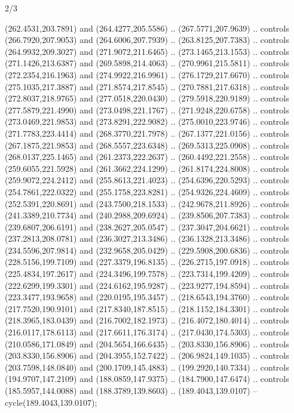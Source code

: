 \begin{flagdescription}{2/3}
\begin{scope}[xshift=0.5\flaglength,yshift=0.5\flagwidth,scale=\flagwidth/240]
\begin{scope}[y=0.8pt, x=0.8pt, yscale=-1,shift={(-225.0,-150)}]
  (262.4531,203.7891) and (264.4277,205.5586) .. (267.5771,207.9639) .. controls
  (266.7920,207.9053) and (264.6006,207.7939) .. (263.8125,207.7383) .. controls
  (264.9932,209.3027) and (271.9072,211.6465) .. (273.1465,213.1553) .. controls
  (271.1426,213.6387) and (269.5898,214.4063) .. (270.9961,215.5811) .. controls
  (272.2354,216.1963) and (274.9922,216.9961) .. (276.1729,217.6670) .. controls
  (275.1035,217.3887) and (271.8574,217.8545) .. (270.7881,217.6318) .. controls
  (272.8037,218.9765) and (277.0518,220.0430) .. (279.5918,220.9189) .. controls
  (277.5879,221.4990) and (273.0498,221.1767) .. (271.9248,220.6758) .. controls
  (273.0469,221.9853) and (273.8291,222.9082) .. (275.0010,223.9746) .. controls
  (271.7783,223.4414) and (268.3770,221.7978) .. (267.1377,221.0156) .. controls
  (267.1875,221.9853) and (268.5557,223.6348) .. (269.5313,225.0908) .. controls
  (268.0137,225.1465) and (261.2373,222.2637) .. (260.4492,221.2558) .. controls
  (259.6055,221.5928) and (261.3662,224.1299) .. (261.8174,224.8008) .. controls
  (259.9072,224.2412) and (255.8613,221.4023) .. (254.6396,220.5293) .. controls
  (254.7861,222.0322) and (255.1758,223.8281) .. (254.9326,224.4609) .. controls
  (252.5391,220.8691) and (243.7500,218.1533) .. (242.9678,211.8926) .. controls
  (241.3389,210.7734) and (240.2988,209.6924) .. (239.8506,207.7383) .. controls
  (239.6807,206.6191) and (238.2627,205.0547) .. (237.3047,204.6621) .. controls
  (237.2813,208.0781) and (236.3027,213.3486) .. (236.1328,213.3486) .. controls
  (234.5596,207.9814) and (232.9658,205.0429) .. (229.5908,200.6836) .. controls
  (228.5156,199.7109) and (227.3379,196.8135) .. (226.2715,197.0918) .. controls
  (225.4834,197.2617) and (224.3496,199.7578) .. (223.7314,199.4209) .. controls
  (222.6299,199.3301) and (224.6162,195.9287) .. (223.9277,194.8594) .. controls
  (223.3477,193.9658) and (220.0195,195.3457) .. (218.6543,194.3760) .. controls
  (217.7520,190.9101) and (217.8340,187.8515) .. (218.1152,184.3301) .. controls
  (218.3965,183.0439) and (216.7002,182.1973) .. (216.4072,180.4014) .. controls
  (216.0117,178.6113) and (217.6611,176.3174) .. (217.0430,174.5303) .. controls
  (210.0586,171.0849) and (204.5654,166.6435) .. (203.8330,156.8906) .. controls
  (203.8330,156.8906) and (204.3955,152.7422) .. (206.9824,149.1035) .. controls
  (203.7598,148.0840) and (200.1709,145.4883) .. (199.2920,140.7334) .. controls
  (194.9707,147.2109) and (188.0859,147.9375) .. (184.7900,147.6474) .. controls
  (185.5957,144.0088) and (188.3789,139.8603) .. (189.4043,139.0107) --
  cycle(189.4043,139.0107);

\end{scope}
\end{scope}
\end{flagdescription}
